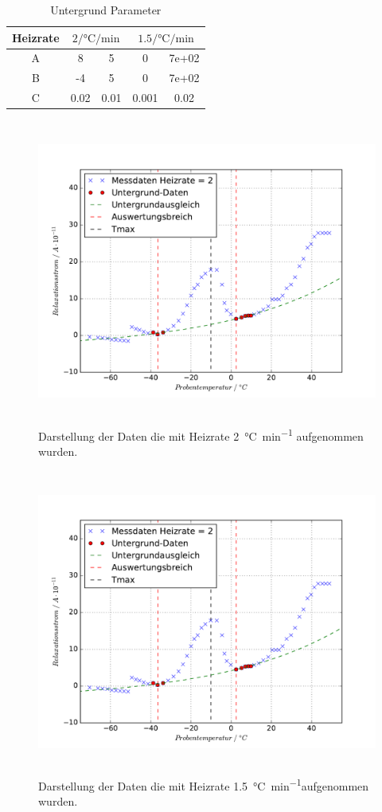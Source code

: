 \begin{table}
 \centering
 \caption{Untergrund Parameter}
 \begin{tabular}{c| S@{${}\pm{}$} S | S@{${}\pm{}$} S}
   \toprule
    Heizrate &
     &
     \\
   \midrule
	A & 8&5&0&7e+02\\
	B&-4&5&0&7e+02\\
	C &0.02&0.01&0.001&0.02\\
   \bottomrule
 \end{tabular}
 \label{tab:Uparam}
\end{table}

\begin{figure}
  \centering
  \includegraphics[height = 10cm]{plots/M1UGplot.pdf}
  \caption{Darstellung der Daten die mit Heizrate \SI{2}{\celsius\per\minute} aufgenommen wurden.}
  \label{fig:U2plot}
\end{figure}
\begin{figure}
  \centering
  \includegraphics[height = 10cm]{plots/M1UGplot.pdf}
  \caption{Darstellung der Daten die mit Heizrate \SI{1.5}{\celsius\per\minute}aufgenommen wurden.}
  \label{fig:U15plot}
\end{figure}
\FloatBarrier
